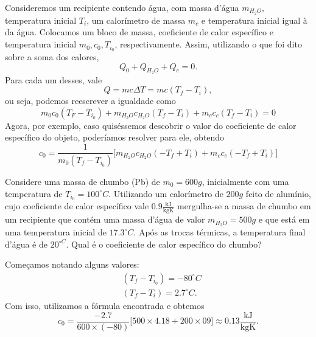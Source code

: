 \documentclass[PhysicsII/phsyicsII_notes.tex]{subfiles}
\begin{document}
Consideremos um recipiente contendo água, com massa d'água \(m_{H_{2}O},\) temperatura inicial \(T_{i}\), um calorímetro
de massa \(m_{c}\) e temperatura inicial igual à da água. Colocamos um bloco de massa, coeficiente de calor específico e temperatura inicial \(m_{0}, c_{0}, T_{i_{0}}\),
respectivamente. Assim, utilizando o que foi dito sobre a soma dos calores,
\[
	Q_{0} + Q_{H_{2}O} + Q_{c} = 0.
\]
Para cada um desses, vale
\[
	Q = mc\Delta T = mc(T_{f}-T_{i}),
\]
ou seja, podemos reescrever a igualdade como
\[
	m_{0}c_{0}(T_{F} - T_{i_{0}}) + m_{H_{2}O}c_{H_{2}O}(T_{f}-T_{i}) + m_{c}c_{c}(T_{f}-T_{i}) = 0
\]
Agora, por exemplo, caso quiséssemos descobrir o valor do coeficiente de calor específico do objeto, poderíamos resolver para ele, obtendo
\[
	c_{0} = \frac{1}{m_{0}(T_{f}-T_{i_{0}})}\biggl[m_{H_{2}O}c_{H_{2}O}(-T_{f}+T_{i}) + m_{c}c_{c}(-T_{f}+T_{i})\biggr]
\]
\begin{example}
	Considere uma massa de chumbo (Pb) de \(m_{0} = 600g\), inicialmente com uma temperatura de \(T_{i_{0}} = 100^{\circ{}}C\). Utilizando um calorímetro de
	\(200g\) feito de alumínio, cujo coeficiente de calor específico vale \(0.9\frac{\text{kJ}}{\text{kgK}}\) mergulha-se a massa de chumbo em um recipiente que contém uma massa d'água de valor \(m_{H_{2}O}=500g\) e
	que está em uma temperatura inicial de \(17.3^{\circ{}}C.\) Após as trocas térmicas, a temperatura final d'água é de \(20^{\circ{}C}\). Qual é o coeficiente
	de calor específico do chumbo?

	Começamos notando alguns valores:
	\begin{align*}
		 & (T_{f}-T_{i_{0}}) = -80^{\circ{}}C \\
		 & (T_{f}-T_{i}) = 2.7^{\circ{}}C.
	\end{align*}
	Com isso, utilizamos a fórmula encontrada e obtemos
	\[
		c_{0} = \frac{-2.7}{600\times(-80)}\biggl[500\times 4.18 + 200\times 09\biggr]\approx 0.13 \frac{\text{kJ}}{\text{kgK}}.
	\]
\end{example}
\end{document}
